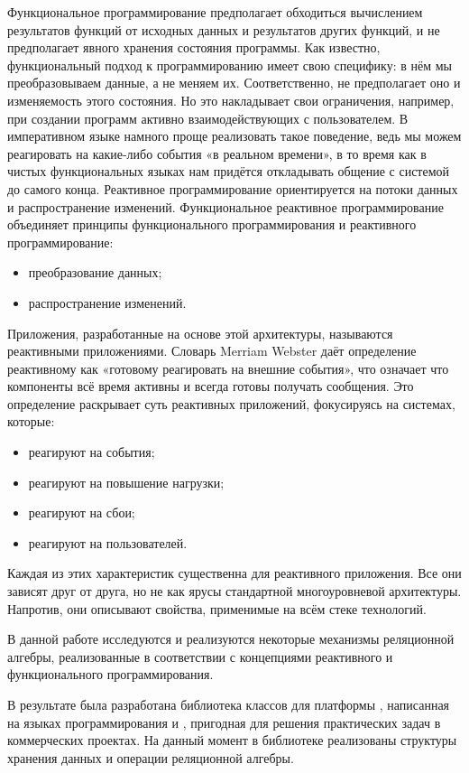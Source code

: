 Функциональное программирование предполагает обходиться вычислением результатов функций от исходных данных и результатов других функций, и не предполагает явного хранения состояния программы. Как известно, функциональный подход к программированию имеет свою специфику: в нём мы преобразовываем данные, а не меняем их. Соответственно, не предполагает оно и изменяемость этого состояния. Но это накладывает свои ограничения, например, при создании программ активно взаимодействующих с пользователем. В императивном языке намного проще реализовать такое поведение, ведь мы можем реагировать на какие-либо события «в реальном времени», в то время как в чистых функциональных языках нам придётся откладывать общение с системой до самого конца. Реактивное программирование ориентируется на потоки данных и распространение изменений. Функциональное реактивное программирование объединяет принципы функционального программирования и реактивного программирование:

\begin{itemize}
  \item преобразование данных;
  \item распространение изменений.
\end{itemize}

Приложения, разработанные на основе этой архитектуры, называются реактивными приложениями. Словарь Merriam Webster даёт определение реактивному как «готовому реагировать на внешние события», что означает что компоненты всё время активны и всегда готовы получать сообщения. Это определение раскрывает суть реактивных приложений, фокусируясь на системах, которые:

\begin{itemize}
  \item реагируют на события;
  \item реагируют на повышение нагрузки;
  \item реагируют на сбои;
  \item реагируют на пользователей.
\end{itemize}

Каждая из этих характеристик существенна для реактивного приложения. Все они зависят друг от друга, но не как ярусы стандартной многоуровневой архитектуры. Напротив, они описывают свойства, применимые на всём стеке технологий.

В данной работе исследуются и реализуются некоторые механизмы реляционной алгебры, реализованные в соответствии с концепциями реактивного и функционального программирования.

В результате была разработана библиотека классов для платформы \dotnet{}, написанная на языках программирования \csharp{} и \fsharp{}, пригодная для решения практических задач в коммерческих проектах.
На данный момент в библиотеке реализованы структуры хранения данных и операции реляционной алгебры.
